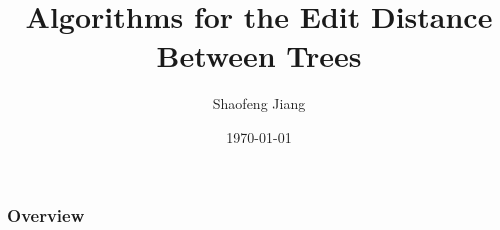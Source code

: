 \documentclass{beamer}
\title[Trees Edit Distance]{Algorithms for the Edit Distance Between Trees} %
\author{Shaofeng Jiang} %
\institute[Western University] %
{
Western University \\ %
\medskip
\textit{sjian7@uwo.ca} %
}
\date{\today} %
\begin{document}
\begin{frame}
\titlepage %
\end{frame}

\begin{frame}
\frametitle{Overview} %
  \tableofcontents
\end{frame}


\end{document}
